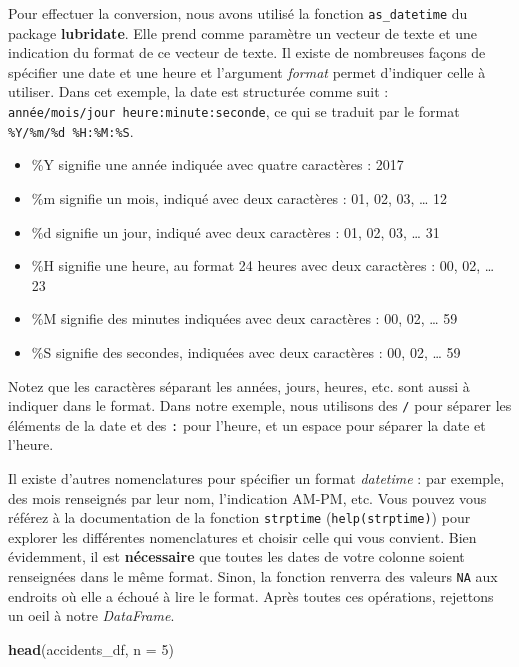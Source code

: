 \documentclass[
  11pt,
  french,
]{book}
\makeatletter
\newenvironment{Shaded}{\begin{snugshade}}{\end{snugshade}}
\newcommand{\DataTypeTok}[1]{\textcolor[rgb]{0.13,0.29,0.53}{#1}}
\newcommand{\DecValTok}[1]{\textcolor[rgb]{0.00,0.00,0.81}{#1}}
\newcommand{\KeywordTok}[1]{\textcolor[rgb]{0.13,0.29,0.53}{\textbf{#1}}}
\newcommand{\NormalTok}[1]{#1}
\providecommand{\tightlist}{%
  \setlength{\itemsep}{0pt}\setlength{\parskip}{0pt}}
\newenvironment{kframe}{%
\medskip{}
\setlength{\fboxsep}{.8em}
 \def\at@end@of@kframe{}%
 \ifinner\ifhmode%
  \def\at@end@of@kframe{\end{minipage}}%
  \begin{minipage}{\columnwidth}%
 \fi\fi%
 \def\FrameCommand##1{\hskip\@totalleftmargin \hskip-\fboxsep
 \colorbox{shadecolor}{##1}\hskip-\fboxsep
     \hskip-\linewidth \hskip-\@totalleftmargin \hskip\columnwidth}%
 \MakeFramed {\advance\hsize-\width
   \@totalleftmargin\z@ \linewidth\hsize
   \@setminipage}}%
 {\par\unskip\endMakeFramed%
 \at@end@of@kframe}
\renewenvironment{Shaded}{\begin{kframe}}{\end{kframe}}
\makeatother
\begin{document}
Pour effectuer la conversion, nous avons utilisé la fonction \texttt{as\_datetime} du package \textbf{lubridate}. Elle prend comme paramètre un vecteur de texte et une indication du format de ce vecteur de texte. Il existe de nombreuses façons de spécifier une date et une heure et l'argument \emph{format} permet d'indiquer celle à utiliser. Dans cet exemple, la date est structurée comme suit :
\texttt{année/mois/jour\ heure:minute:seconde}, ce qui se traduit par le format \texttt{\%Y/\%m/\%d\ \%H:\%M:\%S}.

\begin{itemize}
\tightlist
\item
  \%Y signifie une année indiquée avec quatre caractères : 2017
\item
  \%m signifie un mois, indiqué avec deux caractères : 01, 02, 03, \ldots{} 12
\item
  \%d signifie un jour, indiqué avec deux caractères : 01, 02, 03, \ldots{} 31
\item
  \%H signifie une heure, au format 24 heures avec deux caractères : 00, 02, \ldots{} 23
\item
  \%M signifie des minutes indiquées avec deux caractères : 00, 02, \ldots{} 59
\item
  \%S signifie des secondes, indiquées avec deux caractères : 00, 02, \ldots{} 59
\end{itemize}

Notez que les caractères séparant les années, jours, heures, etc. sont aussi à indiquer dans le format. Dans notre exemple, nous utilisons des \texttt{/} pour séparer les éléments de la date et des \texttt{:} pour l'heure, et un espace pour séparer la date et l'heure.

Il existe d'autres nomenclatures pour spécifier un format \emph{datetime} : par exemple, des mois renseignés par leur nom, l'indication AM-PM, etc. Vous pouvez vous référez à la documentation de la fonction \texttt{strptime} (\texttt{help(strptime)}) pour explorer les différentes nomenclatures et choisir celle qui vous convient. Bien évidemment, il est \textbf{nécessaire} que toutes les dates de votre colonne soient renseignées dans le même format. Sinon, la fonction renverra des valeurs \texttt{NA} aux endroits où elle a échoué à lire le format. Après toutes ces opérations, rejettons un oeil à notre \emph{DataFrame}.

\begin{Shaded}
\begin{Highlighting}[]
\KeywordTok{head}\NormalTok{(accidents_df, }\DataTypeTok{n =} \DecValTok{5}\NormalTok{)}
\end{Highlighting}
\end{Shaded}
\end{document}
